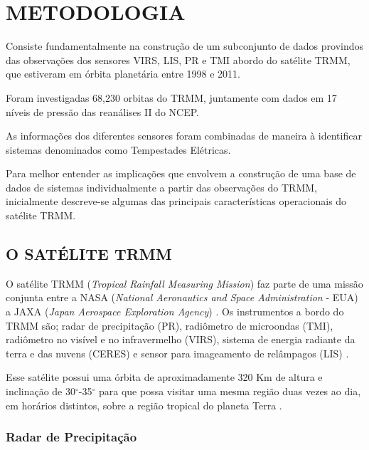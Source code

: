 \chapter{METODOLOGIA}

Consiste fundamentalmente na construção de um subconjunto de dados provindos das observações dos sensores VIRS, LIS, PR e TMI abordo do satélite TRMM, que estiveram em órbita planetária entre 1998 e 2011. 

Foram investigadas 68,230 orbitas do TRMM, juntamente com dados em 17 níveis de pressão das reanálises II do NCEP. 

As informações dos diferentes sensores foram combinadas de maneira à identificar sistemas denominados como Tempestades Elétricas. 

Para melhor entender as implicações que envolvem a construção de uma base de dados de sistemas individualmente a partir das observações do TRMM, inicialmente descreve-se algumas das principais características operacionais do satélite TRMM.

\section{O SATÉLITE TRMM}

O satélite TRMM (\textit{Tropical Rainfall Measuring Mission})  faz parte de uma missão conjunta entre a NASA (\textit{National Aeronautics and Space Administration} - EUA) a JAXA (\textit{Japan Aerospace Exploration Agency}) \cite{simpson1988}. Os instrumentos a bordo do TRMM são; radar de precipitação (PR), radiômetro de microondas (TMI),  radiômetro no visível e no infravermelho (VIRS), sistema de energia radiante da terra e das nuvens (CERES) e sensor para imageamento de relâmpagos (LIS) \cite{kummerok1998}. 


Esse satélite possui uma órbita de aproximadamente 320 Km de altura e inclinação de 30$^{\circ}$-35$^{\circ}$ para que possa visitar uma mesma região duas vezes ao dia, em horários distintos, sobre a região tropical do planeta Terra \cite{simpson1988}.   

\subsection{Radar de Precipitação}

